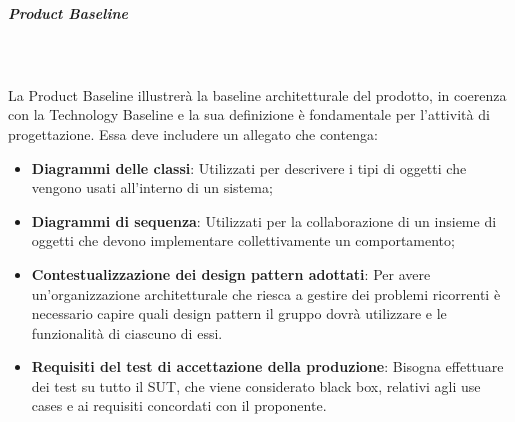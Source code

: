 \subparagraph{Product Baseline}\mbox{}\\ \\
La Product Baseline illustrerà la baseline architetturale del prodotto, in coerenza con la Technology Baseline e la sua definizione è fondamentale per l'attività di progettazione.
Essa deve includere un allegato che contenga:
\begin{itemize}
	\item \textbf{Diagrammi delle classi}: Utilizzati per descrivere i tipi di oggetti che vengono usati all'interno di un sistema;
	\item \textbf{Diagrammi di sequenza}: Utilizzati per la collaborazione di un insieme di oggetti che devono implementare collettivamente un comportamento;
	\item \textbf{Contestualizzazione dei design pattern adottati}: Per avere un'organizzazione architetturale che riesca a gestire dei problemi ricorrenti è necessario capire quali design pattern il gruppo dovrà utilizzare e le funzionalità di ciascuno di essi.	
	\item \textbf{Requisiti del test di accettazione della produzione}: Bisogna effettuare dei test su tutto il SUT, che viene considerato black box, relativi agli use cases e ai requisiti concordati con il proponente.
\end{itemize}